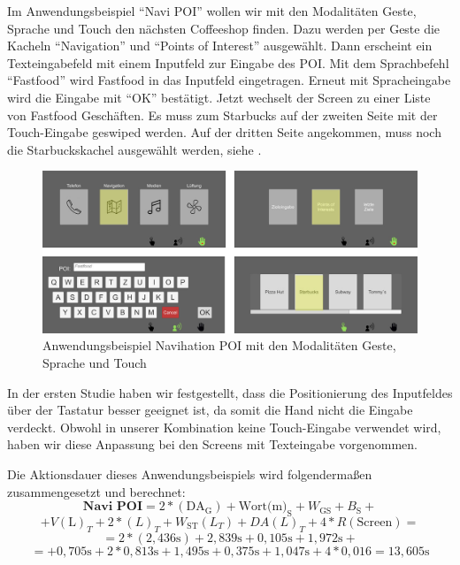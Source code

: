 Im Anwendungsbeispiel "`Navi POI"' wollen wir mit den Modalitäten Geste, Sprache und Touch den nächsten Coffeeshop finden. 
Dazu werden per Geste die Kacheln "`Navigation"' und "`Points of Interest"' ausgewählt. 
Dann erscheint ein Texteingabefeld mit einem Inputfeld zur Eingabe des POI. 
Mit dem Sprachbefehl "`Fastfood"' wird Fastfood in das Inputfeld eingetragen. 
Erneut mit Spracheingabe wird die Eingabe mit "`OK"' bestätigt. 
Jetzt wechselt der Screen zu einer Liste von Fastfood Geschäften. 
Es muss zum Starbucks auf der zweiten Seite mit der Touch-Eingabe geswiped werden. 
Auf der dritten Seite angekommen, muss noch die Starbuckskachel ausgewählt werden, siehe .  
\begin{figure}[ht]
	\centering
		\includegraphics[width=1\textwidth]{img/UseCases_Eval_Navi_POI.jpg}
	\caption{Anwendungsbeispiel Navihation POI mit den Modalitäten Geste, Sprache und Touch}
	\label{fig:UseCasesEvalNaviPOI}
\end{figure}

In der ersten Studie haben wir festgestellt, dass die Positionierung des Inputfeldes über der Tastatur besser geeignet ist, da somit die Hand nicht die Eingabe verdeckt. Obwohl in unserer Kombination keine Touch-Eingabe verwendet wird, haben wir diese Anpassung bei den Screens mit Texteingabe vorgenommen.

Die Aktionsdauer dieses Anwendungsbeispiels wird folgendermaßen zusammengesetzt und berechnet:
\[	
\textbf{Navi POI} = 2*(\text{DA}_\text{G}) + \text{Wort(m)}_\text{S} + W_\text{GS} + B_\text{S} + 
\]
\[	
+ V(\text{L})_T + 2*(L)_T + W_\text{ST}(L_T) + DA(L)_T + 4*R(\text{Screen}) =
\]
\[
= 2*( 2,436\text{s}) + 2,839\text{s} + 0,105\text{s} + 1,972\text{s} + 
\]
\[
= + 0,705\text{s} + 2*0,813\text{s} + 1,495\text{s} + 0,375\text{s} + 1,047\text{s} + 4*0,016= 13,605\text{s}
\]

